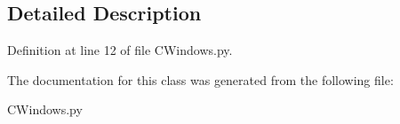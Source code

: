 \subsection{Detailed Description}


Definition at line 12 of file C\+Windows.\+py.



The documentation for this class was generated from the following file\+:\begin{DoxyCompactItemize}
\item 
C\+Windows.\+py\end{DoxyCompactItemize}
